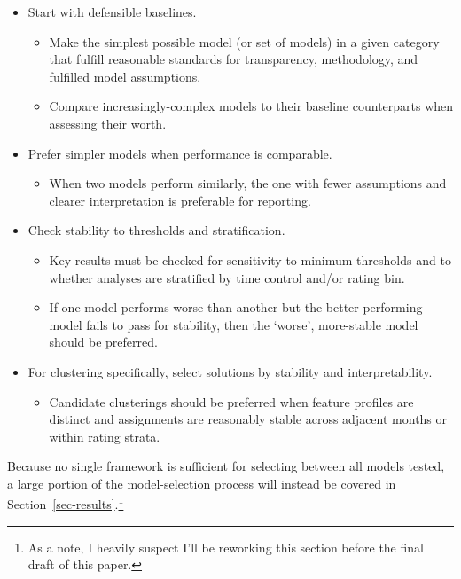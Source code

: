 \documentclass[
  12pt]{article}
\providecommand{\tightlist}{%
  \setlength{\itemsep}{0pt}\setlength{\parskip}{0pt}}\usepackage{longtable,booktabs,array}
\begin{document}
\begin{itemize}
\tightlist
\item
  Start with defensible baselines.

  \begin{itemize}
  \tightlist
  \item
    Make the simplest possible model (or set of models) in a given
    category that fulfill reasonable standards for transparency,
    methodology, and fulfilled model assumptions.
  \item
    Compare increasingly-complex models to their baseline counterparts
    when assessing their worth.
  \end{itemize}
\item
  Prefer simpler models when performance is comparable.

  \begin{itemize}
  \tightlist
  \item
    When two models perform similarly, the one with fewer assumptions
    and clearer interpretation is preferable for reporting.
  \end{itemize}
\item
  Check stability to thresholds and stratification.

  \begin{itemize}
  \tightlist
  \item
    Key results must be checked for sensitivity to minimum thresholds
    and to whether analyses are stratified by time control and/or rating
    bin.
  \item
    If one model performs worse than another but the better-performing
    model fails to pass for stability, then the `worse', more-stable
    model should be preferred.
  \end{itemize}
\item
  For clustering specifically, select solutions by stability and
  interpretability.

  \begin{itemize}
  \tightlist
  \item
    Candidate clusterings should be preferred when feature profiles are
    distinct and assignments are reasonably stable across adjacent
    months or within rating strata.
  \end{itemize}
\end{itemize}

Because no single framework is sufficient for selecting between all
models tested, a large portion of the model-selection process will
instead be covered in Section~\ref{sec-results}.\footnote{As a note, I
  heavily suspect I'll be reworking this section before the final draft
  of this paper.}
\end{document}
